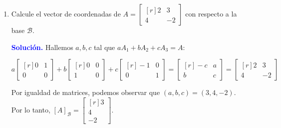 \documentclass[11pt]{article}
\newcommand{\solution}{\textcolor{blue}{\textbf{Solución. }}}
\begin{document}
\begin{enumerate}
\begin{enumerate}
		\item Calcule el vector de coordenadas de $A=
		\begin{bmatrix*}[r]
		    2 & 3 \\ 
		    4 & -2
		\end{bmatrix*}$ con respecto a la base $\mathcal{B}$. \par
		\solution Hallemos $a,b,c$ tal que $aA_1+bA_2+cA_3=A$:
		\begin{center}
		    $a\begin{bmatrix*}[r]
		        0 & 1 \\ 
		        0 & 0
		    \end{bmatrix*} +b
		    \begin{bmatrix*}[r]
		        0 & 0 \\ 
		        1 & 0
		    \end{bmatrix*} +c
		    \begin{bmatrix*}[r]
		        -1 & 0 \\ 
	    	    0 & 1
		    \end{bmatrix*} = 
		    \begin{bmatrix*}[r]
		        -c & a \\ 
		         b & c
		    \end{bmatrix*} =
		    \begin{bmatrix*}[r]
		        2 & 3 \\ 
		        4 & -2
		    \end{bmatrix*}$
		\end{center}

		Por igualdad de matrices, podemos observar que $(a,b,c)=(3,4,-2)$. \\
		Por lo tanto, $[A]_{\mathcal{B}} = \begin{bmatrix*}[r] 3 \\ 4 \\ -2\end{bmatrix*}$.	
	\end{enumerate}


\end{enumerate}
\end{document}
